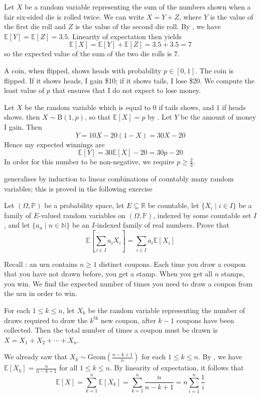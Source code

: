 \begin{example}
Let $X$ be a random variable representing the sum of the numbers shown when a fair six-sided die is rolled twice. We can write $X=Y+Z$, where $Y$ is the value of the first die roll and $Z$ is the value of the second die roll. By , we have $\mathbb{E}[Y]=\mathbb{E}[Z]=3.5$. Linearity of expectation then yields
\[ \mathbb{E}[X] = \mathbb{E}[Y]+\mathbb{E}[Z] = 3.5+3.5 = 7 \]
so the expected value of the sum of the two die rolls is $7$.
\end{example}

\begin{example}
A coin, when flipped, shows heads with probability $p \in [0,1]$. The coin is flipped. If it shows heads, I gain \$10; if it shows tails, I lose \$20. We compute the least value of $p$ that ensures that I do not expect to lose money.

Let $X$ be the random variable which is equal to $0$ if tails shows, and $1$ if heads shows. then $X \sim \mathrm{B}(1,p)$, so that $\mathbb{E}[X]=p$ by . Let $Y$ be the amount of money I gain. Then
\[ Y = 10X - 20(1-X) = 30X-20 \]
Hence my expected winnings are
\[ \mathbb{E}[Y] = 30\mathbb{E}[X] - 20 = 30p-20 \]
In order for this number to be non-negative, we require $p \ge \frac{2}{3}$.
\end{example}

 generalises by induction to linear combinations of countably many random variables; this is proved in the following exercise

\begin{exercise}
Let $(\Omega,\mathbb{P})$ be a probability space, let $E \subseteq \mathbb{R}$ be countable, let $\{ X_i \mid i \in I \}$ be a family of $E$-valued random variables on $(\Omega,\mathbb{P})$, indexed by some countable set $I$, and let $\{ a_n \mid n \in \mathbb{N} \}$ be an $I$-indexed family of real numbers. Prove that
\[ \mathbb{E} \left[ \sum_{i \in I} a_i X_i \right] = \sum_{i \in I} a_i\mathbb{E}[X_i] \]
\end{exercise}

\begin{example}
\label{exCoinCollectorExpectation}
Recall : an urn contains $n \ge 1$ distinct coupons. Each time you draw a coupon that you have not drawn before, you get a stamp. When you get all $n$ stamps, you win. We find the expected number of times you need to draw a coupon from the urn in order to win.

For each $1 \le k \le n$, let $X_k$ be the random variable representing the number of draws required to draw the $k^{\text{th}}$ new coupon, after $k-1$ coupons have been collected. Then the total number of times a coupon must be drawn is $X = X_1+X_2+\cdots+X_n$.

We already saw that $X_k \sim \mathrm{Geom}\left( \frac{n-k+1}{n} \right)$ for each $1 \le k \le n$. By , we have $\mathbb{E}[X_k] = \frac{n}{n-k+1}$ for all $1 \le k \le n$. By linearity of expectation, it follows that
\[ \mathbb{E}[X] = \sum_{k=1}^n \mathbb{E}[X_k] = \sum_{k=1}^n \frac{n}{n-k+1} = n \sum_{i=1}^n \frac{1}{i} \]
\end{example}